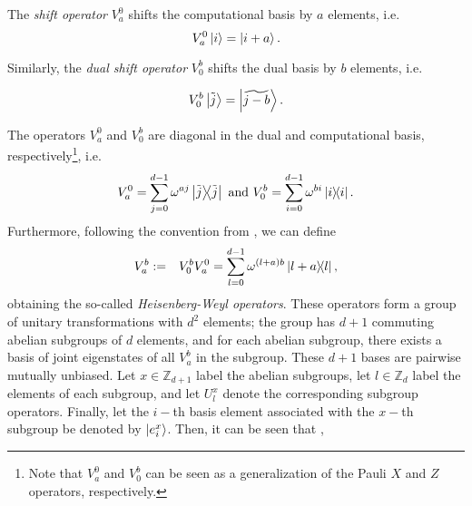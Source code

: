 \begin{definition}
The \textit{shift operator} $V^0_a$ shifts the computational basis by $a$ elements, i.e.
\begin{equation*}
    V^0_a\ket{i} = \ket{i+a}.\label{eq:shiftoperato}
\end{equation*}

Similarly, the \textit{dual shift operator} $V^b_0$ shifts the dual basis by $b$ elements, i.e.

\begin{equation*}
    V^b_0\ket{\tilde{j}} = \ket{\widetilde{j-b}}.\label{eq:dualshift}
\end{equation*}
\end{definition}
The operators $V^0_a$ and $V^b_0$ are diagonal in the dual and computational basis, respectively\footnote{Note that $V^0_a$ and $V^b_0$ can be seen as a generalization of the Pauli $X$ and $Z$ operators, respectively.}, i.e.
\begin{equation*}
    V^0_a = \sum_{j=0}^{d-1} \omega^{a j} \ketbra{\tilde{j}}{\tilde{j}} \text{ and }V^b_0 = \sum_{i=0}^{d-1} \omega^{b i} \ketbra{i}{i}.
\end{equation*}
Furthermore, following the convention from \cite{DEBZ10}, we can define
\begin{eqnarray*}
V^b_a &:=& V^b_0 V_a^0= \sum^{d-1}_{l=0} \omega^{(l+a)b} \ketbra{l+a}{l},
\end{eqnarray*}
obtaining the so-called \textit{Heisenberg-Weyl operators}. These operators form a group of unitary transformations with $d^2$ elements; the group has $d+1$ commuting abelian subgroups of $d$ elements, and for each abelian subgroup, there exists a basis of joint eigenstates of all $V^b_a$ in the subgroup. These $d+1$ bases are pairwise mutually unbiased.
Let $x\in\mathbb{Z}_{d+1}$ label the abelian subgroups, let $l\in\mathbb{Z}_d$ label the elements of each subgroup, and let $U^x_l$ denote the corresponding subgroup operators. Finally, let the $i-$th basis element associated with the $x-$th subgroup be denoted by $\ket{e^x_i}$. Then, it can be seen that \cite{DEBZ10},

